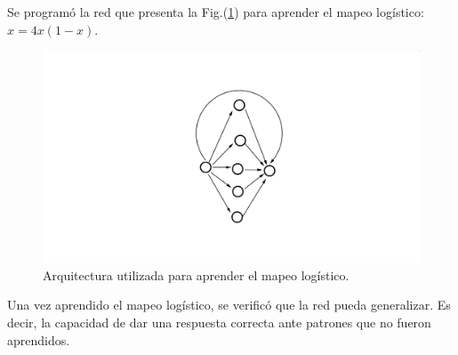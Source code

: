 \documentclass[aps,prb,onecolumn,10pt,floatfix,superscriptaddress]{article} %
\begin{document}
Se program\'o la red que presenta la Fig.(\ref{red3}) para aprender el mapeo log\'istico: $x = 4 x (1-x)$.

\pagebreak

\begin{figure}[!htd]
\begin{center}
 \includegraphics[scale=0.25]{red4.png}
  \caption{\label{red3} Arquitectura utilizada para aprender el mapeo log\'istico.}
  \end{center}
 \end{figure}

Una vez aprendido el mapeo log\'istico, se verific\'o que la red pueda generalizar. Es decir, la capacidad de dar una respuesta correcta ante patrones que no fueron aprendidos.
\end{document}
